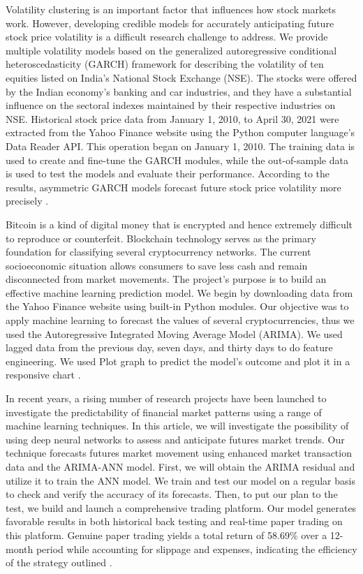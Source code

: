 Volatility clustering is an important factor that influences how stock markets work. However, developing credible models for accurately anticipating future stock price volatility is a difficult research challenge to address. We provide multiple volatility models based on the generalized autoregressive conditional heteroscedasticity (GARCH) framework for describing the volatility of ten equities listed on India's National Stock Exchange (NSE). The stocks were offered by the Indian economy's banking and car industries, and they have a substantial influence on the sectoral indexes maintained by their respective industries on NSE. Historical stock price data from January 1, 2010, to April 30, 2021 were extracted from the Yahoo Finance website using the Python computer language's Data Reader API. This operation began on January 1, 2010. The training data is used to create and fine-tune the GARCH modules, while the out-of-sample data is used to test the models and evaluate their performance. According to the results, asymmetric GARCH models forecast future stock price volatility more precisely \citep{sen2021volatility}.

Bitcoin is a kind of digital money that is encrypted and hence extremely difficult to reproduce or counterfeit. Blockchain technology serves as the primary foundation for classifying several cryptocurrency networks. The current socioeconomic situation allows consumers to save less cash and remain disconnected from market movements. The project's purpose is to build an effective machine learning prediction model. We begin by downloading data from the Yahoo Finance website using built-in Python modules. Our objective was to apply machine learning to forecast the values of several cryptocurrencies, thus we used the Autoregressive Integrated Moving Average Model (ARIMA). We used lagged data from the previous day, seven days, and thirty days to do feature engineering. We used Plot graph to predict the model's outcome and plot it in a responsive chart \citep{aanandhi2021cryptocurrency}.

In recent years, a rising number of research projects have been launched to investigate the predictability of financial market patterns using a range of machine learning techniques. In this article, we will investigate the possibility of using deep neural networks to assess and anticipate futures market trends. Our technique forecasts futures market movement using enhanced market transaction data and the ARIMA-ANN model. First, we will obtain the ARIMA residual and utilize it to train the ANN model. We train and test our model on a regular basis to check and verify the accuracy of its forecasts. Then, to put our plan to the test, we build and launch a comprehensive trading platform. Our model generates favorable results in both historical back testing and real-time paper trading on this platform. Genuine paper trading yields a total return of 58.69\% over a 12-month period while accounting for slippage and expenses, indicating the efficiency of the strategy outlined \citep{sun2019predicting}.

